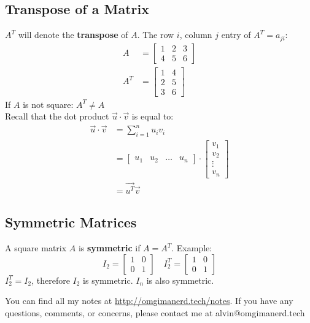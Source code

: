 \documentclass[letterpaper, 12pt]{math}
\begin{document}
\subsection*{Transpose of a Matrix}
\( A^T \) will denote the \textbf{transpose} of \( A \). The row \( i \),
column \( j \) entry of \( A^T = a_{ji} \):
\begin{align*}
  A &= \begin{bmatrix}1 & 2 & 3 \\ 4 & 5 & 6\end{bmatrix} \\
  A^T &= \begin{bmatrix}1 & 4 \\ 2 & 5 \\ 3 & 6\end{bmatrix}
\end{align*}
If \( A \) is not square: \( A^T \ne A \) \\
Recall that the dot product \( \vec{u}\cdot\vec{v} \) is equal to:
\begin{align*}
  \vec{u}\cdot\vec{v} &= \sum_{i=1}^{n}u_iv_i \\
  &= \begin{bmatrix}u_1 & u_2 & \dots & u_n\end{bmatrix}\cdot
    \begin{bmatrix}v_1 \\ v_2 \\ \vdots \\ v_n\end{bmatrix} \\
  &= \vec{u^T}\vec{v}
\end{align*}

\subsection*{Symmetric Matrices}
A square matrix \( A \) is \textbf{symmetric} if \( A = A^T \). Example:
\[ I_2 = \begin{bmatrix}1 & 0 \\ 0 & 1\end{bmatrix}\quad
  I_2^T = \begin{bmatrix}1 & 0 \\ 0 & 1\end{bmatrix} \]
\( I_2^T = I_2 \), therefore \( I_2 \) is symmetric. \( I_n \) is also
symmetric.

\begin{center}
  You can find all my notes at \url{http://omgimanerd.tech/notes}. If you have
  any questions, comments, or concerns, please contact me at
  alvin@omgimanerd.tech
\end{center}
\end{document}
